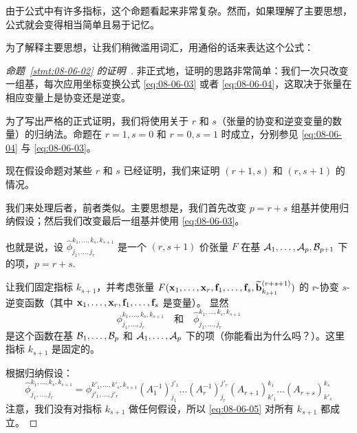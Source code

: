 由于公式中有许多指标，这个命题看起来非常复杂。然而，如果理解了主要思想，公式就会变得相当简单且易于记忆。

为了解释主要思想，让我们稍微滥用词汇，用通俗的话来表达这个公式：




\begin{proof}[\normalfont\heiti 命题~\ref{stmt:08-06-02} 的证明~\nopunct]
非正式地，证明的思路非常简单：我们一次只改变一组基，每次应用坐标变换公式 \eqref{eq:08-06-03} 或者 \eqref{eq:08-06-04}，这取决于张量在相应变量上是协变还是逆变。

为了写出严格的正式证明，我们将使用关于 $r$ 和 $s$（张量的协变和逆变变量的数量）的归纳法。命题在 $r=1, s=0$ 和 $r=0, s=1$ 时成立，分别参见 \eqref{eq:08-06-04} 与 \eqref{eq:08-06-03}。

现在假设命题对某些 $r$ 和 $s$ 已经证明，我们来证明 $(r+1,s)$ 和 $(r,s+1)$ 的情况。

我们来处理后者，前者类似。主要思想是，我们首先改变 $p=r+s$ 组基并使用归纳假设；然后我们改变最后一组基并使用 \eqref{eq:08-06-03}。

也就是说，设 $\hat{\phi}^{k_1, \dots, k_s, k_{s+1}}_{j_1, \dots, j_r}$ 是一个 $(r, s+1)$ 价张量 $F$ 在基 $\mathcal{A}_1, \dots, \mathcal{A}_p, \mathcal{B}_{p+1}$ 下的项，$p=r+s$.~

让我们固定指标 $k_{s+1}$，并考虑张量 $F(\mathbf{x}_1, \dots, \mathbf{x}_r, \mathbf{f}_1, \dots, \mathbf{f}_s, \widetilde{\mathbf{b}}^{(r+s+1)}_{k_{s+1}})$ 的 $r$-协变 $s$-逆变函数（其中 $\mathbf{x}_1, \dots, \mathbf{x}_r, \mathbf{f}_1, \dots, \mathbf{f}_s$ 是变量）。
显然
$$\phi^{k_1, \dots, k_s, k_{s+1}}_{j_1, \dots, j_r}\quad \text{和} \quad \hat{\phi}^{k_1, \dots, k_s, k_{s+1}}_{j_1, \dots, j_r}$$
是这个函数在基 $\mathcal{B}_1, \dots, \mathcal{B}_p$ 和 $\mathcal{A}_1, \dots, \mathcal{A}_p$ 下的项（你能看出为什么吗？）。这里指标 $k_{s+1}$ 是固定的。

根据归纳假设：
\begin{equation}\label{eq:08-06-05}
\hat{\phi}^{k_1, \dots, k_s, k_{s+1}}_{j_1, \dots, j_r} = \phi^{k'_1, \dots, k'_s, k_{s+1}}_{j'_1, \dots, j'_r} (A^{-1}_1)^{j'_1}_{j_1} \dots (A^{-1}_r)^{j'_r}_{j_r} (A_{r+1})^{k_1}_{k'_1} \dots (A_{r+s})^{k_s}_{k'_s}
\end{equation}
注意，我们没有对指标 $k_{s+1}$ 做任何假设，所以 \eqref{eq:08-06-05} 对所有 $k_{s+1}$ 都成立。


\end{proof}
